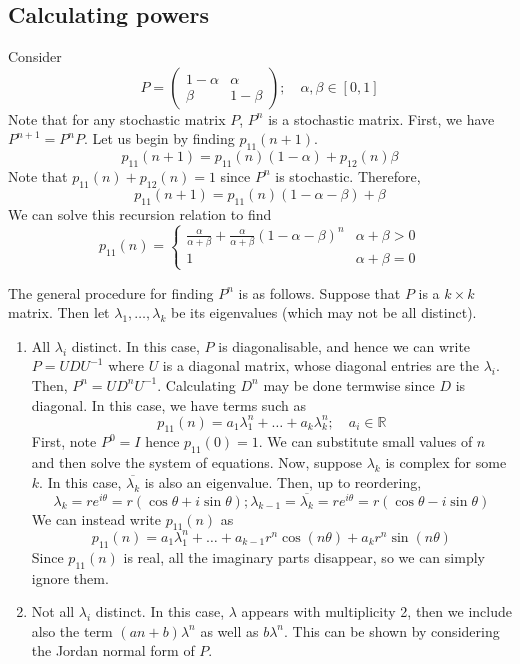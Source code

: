 \subsection{Calculating powers}
\begin{example}
	Consider
	\[
		P = \begin{pmatrix}
			1-\alpha & \alpha \\ \beta & 1-\beta
		\end{pmatrix};\quad \alpha, \beta \in [0,1]
	\]
	Note that for any stochastic matrix \( P \), \( P^n \) is a stochastic matrix.
	First, we have \( P^{n+1} = P^n P \).
	Let us begin by finding \( p_{11}(n+1) \).
	\[
		p_{11}(n+1) = p_{11}(n)(1-\alpha) + p_{12}(n)\beta
	\]
	Note that \( p_{11}(n) + p_{12}(n) = 1 \) since \( P^n \) is stochastic.
	Therefore,
	\[
		p_{11}(n+1) = p_{11}(n)(1-\alpha-\beta) + \beta
	\]
	We can solve this recursion relation to find
	\[
		p_{11}(n) = \begin{cases}
			\frac{\alpha}{\alpha + \beta} + \frac{\alpha}{\alpha + \beta}(1-\alpha-\beta)^n & \alpha + \beta > 0 \\
			1                                                                               & \alpha + \beta = 0\end{cases}
	\]
\end{example}
The general procedure for finding \( P^n \) is as follows.
Suppose that \( P \) is a \( k \times k \) matrix.
Then let \( \lambda_1, \dots, \lambda_k \) be its eigenvalues (which may not be all distinct).
\begin{enumerate}[(1)]
	\item All \( \lambda_i \) distinct.
	      In this case, \( P \) is diagonalisable, and hence we can write \( P = U D U^{-1} \) where \( U \) is a diagonal matrix, whose diagonal entries are the \( \lambda_i \).
	      Then, \( P^n = U D^n U^{-1} \).
	      Calculating \( D^n \) may be done termwise since \( D \) is diagonal.
	      In this case, we have terms such as
	      \[
		      p_{11}(n) = a_1 \lambda_1^n + \dots + a_k \lambda_k^n; \quad a_i \in \mathbb R
	      \]
	      First, note \( P^0 = I \) hence \( p_{11}(0) = 1 \).
	      We can substitute small values of \( n \) and then solve the system of equations.
	      Now, suppose \( \lambda_k \) is complex for some \( k \).
	      In this case, \( \overline{\lambda_k} \) is also an eigenvalue.
	      Then, up to reordering,
	      \[
		      \lambda_k = re^{i\theta} = r(\cos \theta + i \sin \theta); \lambda_{k-1} = \overline{\lambda_k} = re^{i\theta} = r(\cos \theta - i \sin \theta)
	      \]
	      We can instead write \( p_{11}(n) \) as
	      \[
		      p_{11}(n) = a_1 \lambda_1^n + \dots + a_{k-1} r^n \cos (n\theta) + a_k r^n \sin (n\theta)
	      \]
	      Since \( p_{11}(n) \) is real, all the imaginary parts disappear, so we can simply ignore them.
	\item Not all \( \lambda_i \) distinct.
	      In this case, \( \lambda \) appears with multiplicity 2, then we include also the term \( (an + b) \lambda^n \) as well as \( b \lambda^n \).
	      This can be shown by considering the Jordan normal form of \( P \).
\end{enumerate}
